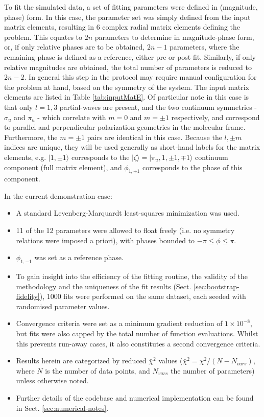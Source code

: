 \documentclass[10pt]{article}
\begin{document}
To fit the simulated data, a set of fitting parameters were defined in (magnitude, phase) form. In this case, the parameter set was simply defined from the input matrix elements, resulting in 6 complex radial matrix elements defining the problem. This equates to $2n$ parameters to determine in magnitude-phase form, or, if only relative phases are to be obtained, $2n-1$ parameters, where the remaining phase is defined as a reference, either pre or post fit. Similarly, if only relative magnitudes are obtained, the total number of parameters is reduced to $2n-2$. In general this step in the protocol may require manual configuration for the problem at hand, based on the symmetry of the system. The input matrix elements are listed in Table \ref{tab:inputMatE}. Of particular note in this case is that only $l=1,3$ partial-waves are present, and the two continuum symmetries - $\sigma_u$ and $\pi_u$ - which correlate with $m=0$ and $m=\pm1$ respectively, and correspond to parallel and perpendicular polarization geometries in the molecular frame. Furthermore, the $m=\pm1$ pairs are identical in this case. Because the $l,\pm m$ indices are unique, they will be used generally as short-hand labels for the matrix elements, e.g. $|1,\pm1\rangle$ corresponds to the $|\zeta\rangle = |\pi_u,1,\pm 1,\mp 1 \rangle$ continuum component (full matrix element), and $\phi_{1,\pm1}$ corresponds to the phase of this component.

In the current demonstration case:

\begin{itemize}
\item A standard Levenberg-Marquardt least-squares minimization was used.
\item 11 of the 12 parameters were allowed to float freely (i.e. no symmetry relations were imposed a priori), with phases bounded to $-\pi\leq\phi\leq\pi$. %
\item $\phi_{1,-1}$ was set as a reference phase. 
\item To gain insight into the efficiency of the fitting routine, the validity of the methodology and the uniqueness of the fit results (Sect. \ref{sec:bootstrap-fidelity}), 1000 fits were performed on the same dataset, each seeded with randomised parameter values. 
\item Convergence criteria were set as a minimum gradient reduction of $1\times10^{-8}$, %
but fits were also capped by the total number of function evaluations. Whilst this prevents run-away cases, it also constitutes a second convergence criteria.
\item Results herein are categorized by reduced $\bar{\chi}^2$ values ($\bar{\chi}^2=\chi^2/(N-N_{vars})$, where $N$ is the number of data points, and $N_{vars}$ the number of parameters) unless otherwise noted.
\item Further details of the codebase and numerical implementation can be found in Sect. \ref{sec:numerical-notes}.
\end{itemize}
\end{document}
